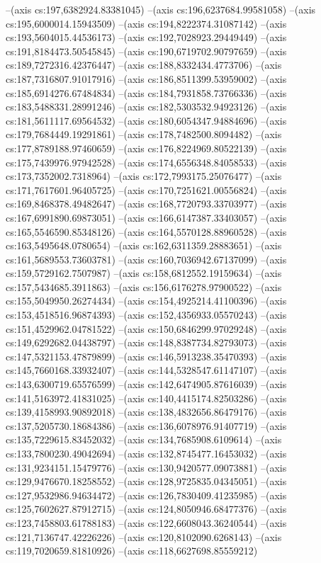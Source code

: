 --(axis cs:197,6382924.83381045)
--(axis cs:196,6237684.99581058)
--(axis cs:195,6000014.15943509)
--(axis cs:194,8222374.31087142)
--(axis cs:193,5604015.44536173)
--(axis cs:192,7028923.29449449)
--(axis cs:191,8184473.50545845)
--(axis cs:190,6719702.90797659)
--(axis cs:189,7272316.42376447)
--(axis cs:188,8332434.4773706)
--(axis cs:187,7316807.91017916)
--(axis cs:186,8511399.53959002)
--(axis cs:185,6914276.67484834)
--(axis cs:184,7931858.73766336)
--(axis cs:183,5488331.28991246)
--(axis cs:182,5303532.94923126)
--(axis cs:181,5611117.69564532)
--(axis cs:180,6054347.94884696)
--(axis cs:179,7684449.19291861)
--(axis cs:178,7482500.8094482)
--(axis cs:177,8789188.97460659)
--(axis cs:176,8224969.80522139)
--(axis cs:175,7439976.97942528)
--(axis cs:174,6556348.84058533)
--(axis cs:173,7352002.7318964)
--(axis cs:172,7993175.25076477)
--(axis cs:171,7617601.96405725)
--(axis cs:170,7251621.00556824)
--(axis cs:169,8468378.49482647)
--(axis cs:168,7720793.33703977)
--(axis cs:167,6991890.69873051)
--(axis cs:166,6147387.33403057)
--(axis cs:165,5546590.85348126)
--(axis cs:164,5570128.88960528)
--(axis cs:163,5495648.0780654)
--(axis cs:162,6311359.28883651)
--(axis cs:161,5689553.73603781)
--(axis cs:160,7036942.67137099)
--(axis cs:159,5729162.7507987)
--(axis cs:158,6812552.19159634)
--(axis cs:157,5434685.3911863)
--(axis cs:156,6176278.97900522)
--(axis cs:155,5049950.26274434)
--(axis cs:154,4925214.41100396)
--(axis cs:153,4518516.96874393)
--(axis cs:152,4356933.05570243)
--(axis cs:151,4529962.04781522)
--(axis cs:150,6846299.97029248)
--(axis cs:149,6292682.04438797)
--(axis cs:148,8387734.82793073)
--(axis cs:147,5321153.47879899)
--(axis cs:146,5913238.35470393)
--(axis cs:145,7660168.33932407)
--(axis cs:144,5328547.61147107)
--(axis cs:143,6300719.65576599)
--(axis cs:142,6474905.87616039)
--(axis cs:141,5163972.41831025)
--(axis cs:140,4415174.82503286)
--(axis cs:139,4158993.90892018)
--(axis cs:138,4832656.86479176)
--(axis cs:137,5205730.18684386)
--(axis cs:136,6078976.91407719)
--(axis cs:135,7229615.83452032)
--(axis cs:134,7685908.6109614)
--(axis cs:133,7800230.49042694)
--(axis cs:132,8745477.16453032)
--(axis cs:131,9234151.15479776)
--(axis cs:130,9420577.09073881)
--(axis cs:129,9476670.18258552)
--(axis cs:128,9725835.04345051)
--(axis cs:127,9532986.94634472)
--(axis cs:126,7830409.41235985)
--(axis cs:125,7602627.87912715)
--(axis cs:124,8050946.68477376)
--(axis cs:123,7458803.61788183)
--(axis cs:122,6608043.36240544)
--(axis cs:121,7136747.42226226)
--(axis cs:120,8102090.6268143)
--(axis cs:119,7020659.81810926)
--(axis cs:118,6627698.85559212)
